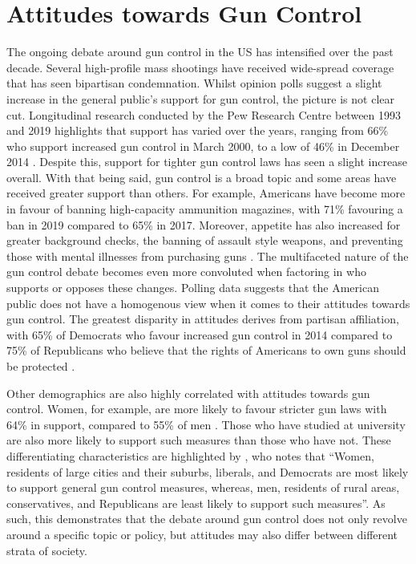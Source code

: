 \documentclass[11pt]{article}
\begin{document}
\section*{Attitudes towards Gun Control}
The ongoing debate around gun control in the US has intensified over the past decade. Several high-profile mass shootings have received wide-spread coverage that has seen bipartisan condemnation. Whilst opinion polls suggest a slight increase in the general public’s support for gun control, the picture is not clear cut. Longitudinal research conducted by the Pew Research Centre between 1993 and 2019 highlights that support has varied over the years, ranging from 66\% who support increased gun control in March 2000, to a low of 46\% in December 2014 \autocite{schaeffer2019share-of-americ}. Despite this, support for tighter gun control laws has seen a slight increase overall. With that being said, gun control is a broad topic and some areas have received greater support than others. For example, Americans have become more in favour of banning high-capacity ammunition magazines, with 71\% favouring a ban in 2019 compared to 65\% in 2017. Moreover, appetite has also increased for greater background checks, the banning of assault style weapons, and preventing those with mental illnesses from purchasing guns \autocite{schaeffer2019share-of-americ}. The multifaceted nature of the gun control debate becomes even more convoluted when factoring in who supports or opposes these changes. Polling data suggests that the American public does not have a homogenous view when it comes to their attitudes towards gun control. The greatest disparity in attitudes derives from partisan affiliation, with 65\% of Democrats who favour increased gun control in 2014 compared to 75\% of Republicans who believe that the rights of Americans to own guns should be protected \autocite{doherty2015a-public-opinio}.

Other demographics are also highly correlated with attitudes towards gun control. Women, for example, are more likely to favour stricter gun laws with 64\% in support, compared to 55\% of men \autocite{schaeffer2019share-of-americ}. Those who have studied at university are also more likely to support such measures than those who have not. These differentiating characteristics are highlighted by \textcite{smith2002public-opinion-}, who notes that ``Women, residents of large cities and their suburbs, liberals, and Democrats are most likely to support general gun control measures, whereas, men, residents of rural areas, conservatives, and Republicans are least likely to support such measures''. As such, this demonstrates that the debate around gun control does not only revolve around a specific topic or policy, but attitudes may also differ between different strata of society.
\end{document}
